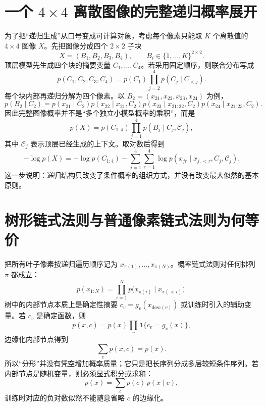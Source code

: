 \documentclass[UTF8,12pt,a4paper,fontset=none]{ctexart}
\numberwithin{equation}{section}
\begin{document}
\section{一个 $4\times4$ 离散图像的完整递归概率展开}
为了把“递归生成”从口号变成可计算对象，考虑每个像素只能取 $K$ 个离散值的 $4\times4$ 图像 $X$。先把图像分成四个 $2\times2$ 子块
\begin{equation}
 X=(B_1,B_2,B_3,B_4),\qquad B_i\in\{1,\ldots,K\}^{2\times2}.
\end{equation}
顶层模型先生成四个块的摘要变量 $C_1,\ldots,C_4$。若采用固定顺序，则联合分布写成
\begin{equation}
 p(C_1,C_2,C_3,C_4)=p(C_1)\prod_{j=2}^{4}p(C_j\mid C_{<j}).
\end{equation}
每个块内部再递归分解为四个像素。以 $B_2=(x_{21},x_{22},x_{23},x_{24})$ 为例，
\begin{equation}
 p(B_2\mid C_2)=p(x_{21}\mid C_2)
 p(x_{22}\mid x_{21},C_2)
 p(x_{23}\mid x_{21:22},C_2)
 p(x_{24}\mid x_{21:23},C_2).
\end{equation}
因此完整图像概率并不是“多个独立小模型概率的乘积”，而是
\begin{equation}
 p(X)=p(C_{1:4})\prod_{j=1}^{4}p(B_j\mid C_j,\mathcal C_j),
\end{equation}
其中 $\mathcal C_j$ 表示顶层已经生成的上下文。取对数后得到
\begin{equation}
 -\log p(X)=-\log p(C_{1:4})-
 \sum_{j=1}^{4}\sum_{r=1}^{4}
 \log p(x_{jr}\mid x_{j,<r},C_j,\mathcal C_j).
\end{equation}
这一步说明：递归结构只改变了条件概率的组织方式，并没有改变最大似然的基本原则。

\section{树形链式法则与普通像素链式法则为何等价}
把所有叶子像素按递归遍历顺序记为 $x_{\pi(1)},\ldots,x_{\pi(N)}$。概率链式法则对任何排列 $\pi$ 都成立：
\begin{equation}
 p(x_{1:N})=\prod_{i=1}^{N}p\bigl(x_{\pi(i)}\mid x_{\pi(<i)}\bigr).
\end{equation}
树中的内部节点本质上是确定性摘要 $c_v=g_v(x_{\mathrm{desc}(v)})$ 或训练时引入的辅助变量。若 $c_v$ 是确定函数，则
\begin{equation}
 p(x,c)=p(x)\prod_v \mathbf 1\{c_v=g_v(x)\},
\end{equation}
边缘化内部节点得到
\begin{equation}
 \sum_c p(x,c)=p(x).
\end{equation}
所以“分形”并没有凭空增加概率质量；它只是把长序列分成多层较短条件序列。若内部节点是随机变量，则必须显式积分或求和：
\begin{equation}
 p(x)=\sum_c p(c)\,p(x\mid c),
\end{equation}
训练时对应的负对数似然不能随意省略 $c$ 的边缘化。
\end{document}
